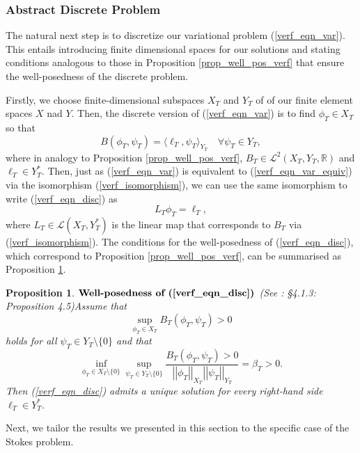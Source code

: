 \documentclass[12pt,a4paper]{article}
\newtheorem{proposition}[theorem]{Proposition}
\theoremstyle{definition}
\begin{document}
\subsubsection{Abstract Discrete Problem}
The natural next step is to discretize our variational problem (\ref{verf_eqn_var}).  This entails introducing finite dimensional spaces for our solutions and stating conditions analogous to those in Proposition \ref{prop_well_pos_verf} that ensure the well-posedness of the discrete problem.  

Firstly, we choose finite-dimensional subspaces $X_T$ and $Y_T$ of of our finite element spaces $X$ nad $Y$.  Then, the discrete version of (\ref{verf_eqn_var}) is to find $\phi_T\in X_T$ so that
\begin{equation}\label{verf_eqn_disc}
B\left(\phi_T,\psi_T\right)=\langle\ell_T,\psi_T\rangle_{Y_T}\quad \forall \psi_T \in Y_T,
\end{equation}
where in analogy to Proposition \ref{prop_well_pos_verf}, $B_T\in \mathcal{L}^2\left(X_T,Y_T,\mathbb{R}\right)$ and $\ell_T\in Y^*_T$.  Then, just as (\ref{verf_eqn_var}) is equivalent to (\ref{verf_eqn_var_equiv}) via the isomorphism (\ref{verf_isomorphism}), we can use the same isomorphism to write (\ref{verf_eqn_disc}) as 
\begin{equation}\label{verf_eqn_var_equiv_disc}
L_T\phi_T=\ell_T,
\end{equation}
where $L_T\in\mathcal{L}\left(X_T,Y_T^*\right)$ is the linear map that corresponds to $B_T$ via (\ref{verf_isomorphism}).   The conditions for the well-posedness of (\ref{verf_eqn_disc}), which correspond to Proposition \ref{prop_well_pos_verf}, can be summarised as Proposition \ref{prop_well_pos_verf_disc}.
\begin{proposition}{$\textbf{Well-posedness of (\ref{verf_eqn_disc})}$} (See \cite{verfurth2013posteriori}: \S 4.1.3: Proposition 4.5)\label{prop_well_pos_verf_disc}
	Assume that 
	\begin{equation}
	\sup_{\phi_T \in X_T}B_T\left(\phi_T,\psi_T\right)>0
	\end{equation}
	holds for all $\psi_T\in Y_T\setminus \lbrace 0 \rbrace$ and that
	\begin{equation}
	\inf_{\phi_T\in X_T\setminus \lbrace0\rbrace}\sup_{\psi_T \in Y_T\setminus \lbrace 0\rbrace}\frac{B_T\left(\phi_T,\psi_T\right)>0}{\left|\left|\phi_T\right|\right|_{X_T}\left|\left|\psi_T\right|\right|_{Y_T}}=\beta_T > 0.
	\end{equation}
	Then (\ref{verf_eqn_disc}) admits a unique solution for every right-hand side $\ell_T\in Y^*_T$.
\end{proposition}
Next, we tailor the results we presented in this section to the specific case of the Stokes problem.
\end{document}
